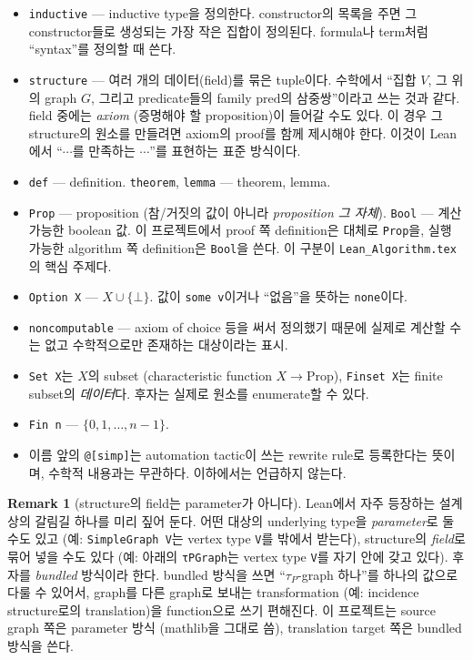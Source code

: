 \documentclass[11pt]{article}
\theoremstyle{definition}
\newtheorem{remark}[definition]{Remark}
\theoremstyle{plain}
\newcommand{\lean}[1]{\texttt{#1}}
\newcommand{\leanfile}[1]{\texttt{#1}}
\begin{document}
\begin{itemize}
  \item \lean{inductive} --- inductive type을 정의한다. constructor의 목록을
    주면 그 constructor들로 생성되는 가장 작은 집합이 정의된다. formula나
    term처럼 ``syntax''를 정의할 때 쓴다.
  \item \lean{structure} --- 여러 개의 데이터(field)를 묶은 tuple이다.
    수학에서 ``집합 $V$, 그 위의 graph $G$, 그리고 predicate들의 family
    $\mathrm{pred}$의 삼중쌍''이라고 쓰는 것과 같다. field 중에는 \emph{axiom}
    (증명해야 할 proposition)이 들어갈 수도 있다. 이 경우 그 structure의
    원소를 만들려면 axiom의 proof를 함께 제시해야 한다. 이것이 Lean에서
    ``$\cdots$를 만족하는 $\cdots$''를 표현하는 표준 방식이다.
  \item \lean{def} --- definition. \lean{theorem}, \lean{lemma} --- theorem,
    lemma.
  \item \lean{Prop} --- proposition (참/거짓의 값이 아니라 \emph{proposition
    그 자체}). \lean{Bool} --- 계산 가능한 boolean 값. 이 프로젝트에서 proof
    쪽 definition은 대체로 \lean{Prop}을, 실행 가능한 algorithm 쪽 definition은
    \lean{Bool}을 쓴다. 이 구분이 \leanfile{Lean\_Algorithm.tex}의 핵심
    주제다.
  \item \lean{Option X} --- $X \cup \{\bot\}$. 값이 \lean{some v}이거나
    ``없음''을 뜻하는 \lean{none}이다.
  \item \lean{noncomputable} --- axiom of choice 등을 써서 정의했기 때문에
    실제로 계산할 수는 없고 수학적으로만 존재하는 대상이라는 표시.
  \item \lean{Set X}는 $X$의 subset (characteristic function
    $X \to \mathrm{Prop}$), \lean{Finset X}는 finite subset의 \emph{데이터}다.
    후자는 실제로 원소를 enumerate할 수 있다.
  \item \lean{Fin n} --- $\{0, 1, \dots, n-1\}$.
  \item 이름 앞의 \lean{@[simp]}는 automation tactic이 쓰는 rewrite rule로
    등록한다는 뜻이며, 수학적 내용과는 무관하다. 이하에서는 언급하지 않는다.
\end{itemize}

\begin{remark}[structure의 field는 parameter가 아니다]
\label{basics:rem:bundled}
Lean에서 자주 등장하는 설계상의 갈림길 하나를 미리 짚어 둔다. 어떤 대상의
underlying type을 \emph{parameter}로 둘 수도 있고 (예: \lean{SimpleGraph V}는
vertex type \lean{V}를 밖에서 받는다), structure의 \emph{field}로 묶어 넣을
수도 있다 (예: 아래의 \lean{τPGraph}는 vertex type \lean{V}를 자기 안에
갖고 있다). 후자를 \emph{bundled} 방식이라 한다. bundled 방식을 쓰면
``$\tau_P$-graph 하나''를 하나의 값으로 다룰 수 있어서, graph를 다른 graph로
보내는 transformation (예: incidence structure로의 translation)을 function으로
쓰기 편해진다. 이 프로젝트는 source graph 쪽은 parameter 방식 (mathlib을
그대로 씀), translation target 쪽은 bundled 방식을 쓴다.
\end{remark}
\end{document}

